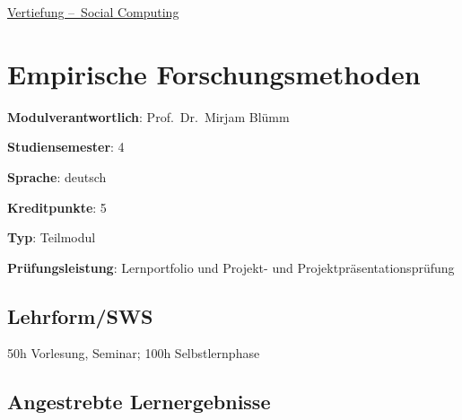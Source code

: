 \hyperref[/mi-2017/modulbeschreibungen-bachelor/BA_Vertiefung_SocialComputing]{Vertiefung – Social Computing}

\hypertarget{empirische-forschungsmethodenpathlabelmi-2017modulbeschreibungen-bachelorba_sc_empirische-forschungsmethoden}{%
\chapter{Empirische
Forschungsmethoden\label{/mi-2017/modulbeschreibungen-bachelor/BA_SC_empirische-forschungsmethoden}}\label{empirische-forschungsmethodenpathlabelmi-2017modulbeschreibungen-bachelorba_sc_empirische-forschungsmethoden}}

\begin{modulHead}
\textbf{Modulverantwortlich}: Prof.~Dr.~Mirjam
Blümm
\end{modulHead}
\begin{modulHead}
\textbf{Studiensemester}:
4
\end{modulHead}
\begin{modulHead}
\textbf{Sprache}:
deutsch
\end{modulHead}
\begin{modulHead}
\textbf{Kreditpunkte}:
5
\end{modulHead}
\begin{modulHead}
\textbf{Typ}:
Teilmodul
\end{modulHead}
\begin{modulHead}
\textbf{Prüfungsleistung}:
Lernportfolio und Projekt- und
Projektpräsentationsprüfung
\end{modulHead}


\hypertarget{lehrformswspathlabelmi-2017modulbeschreibungen-bachelorba_sc_empirische-forschungsmethoden}{%
\section*{Lehrform/SWS\label{/mi-2017/modulbeschreibungen-bachelor/BA_SC_empirische-forschungsmethoden}}\label{lehrformswspathlabelmi-2017modulbeschreibungen-bachelorba_sc_empirische-forschungsmethoden}}

50h Vorlesung, Seminar; 100h Selbstlernphase

\hypertarget{angestrebte-lernergebnissepathlabelmi-2017modulbeschreibungen-bachelorba_sc_empirische-forschungsmethoden}{%
\section*{Angestrebte
Lernergebnisse\label{/mi-2017/modulbeschreibungen-bachelor/BA_SC_empirische-forschungsmethoden}}\label{angestrebte-lernergebnissepathlabelmi-2017modulbeschreibungen-bachelorba_sc_empirische-forschungsmethoden}}

